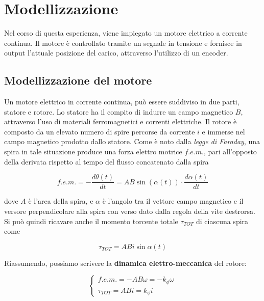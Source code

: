 \section{Modellizzazione}
\label{sec:Modelizzazione}
	
	Nel corso di questa esperienza, viene impiegato un motore elettrico a corrente continua. Il motore è controllato tramite un segnale in tensione e fornisce in output l'attuale posizione del carico, attraverso l'utilizzo di un encoder.
	
	\subsection{Modellizzazione del motore}
	\label{subsec:ModellizzazioneMotore}
	
		Un motore elettrico in corrente continua, può essere suddiviso in due parti, statore e rotore. \newline
		Lo statore ha il compito di indurre un campo magnetico $B$, attraverso l'uso di materiali ferromagnetici e correnti elettriche. \newline
		Il rotore è composto da un elevato numero di spire percorse da corrente $i$ e immerse nel campo magnetico prodotto dallo statore. \newline
		Come è noto dalla \textit{legge di Faraday}, una spira in tale situazione produce una forza elettro motrice $f.e.m.$, pari all'opposto della derivata rispetto al tempo del flusso concatenato dalla spira
	
		\begin{equation}
			f.e.m. = -\frac{d\theta(t)}{dt} = AB\sin(\alpha(t))\cdot\frac{d\alpha(t)}{dt}
			\label{eq:fem}
		\end{equation}
	
		\noindent dove $A$ è l'area della spira, e $\alpha$ è l'angolo tra il vettore campo magnetico e il versore perpendicolare alla spira con verso dato dalla regola della vite destrorsa. \newline
		Si può quindi ricavare anche il momento torcente totale $\tau_{TOT}$ di ciascuna spira come
	
		\begin{equation}
			\tau_{TOT} = ABi\sin{\alpha(t)}
			\label{eq:momentoTorcente}
		\end{equation} 
	
		\noindent Riassumendo, possiamo scrivere la \textbf{dinamica elettro-meccanica} del rotore:
		
		\begin{equation}
			\begin{cases}
				f.e.m. = -AB\omega = -k_{\phi}\omega \\
				\tau_{TOT} = ABi = k_{\phi}i
			\end{cases}
			\label{eq:dinamecaElettroMeccanica}
		\end{equation}
	

